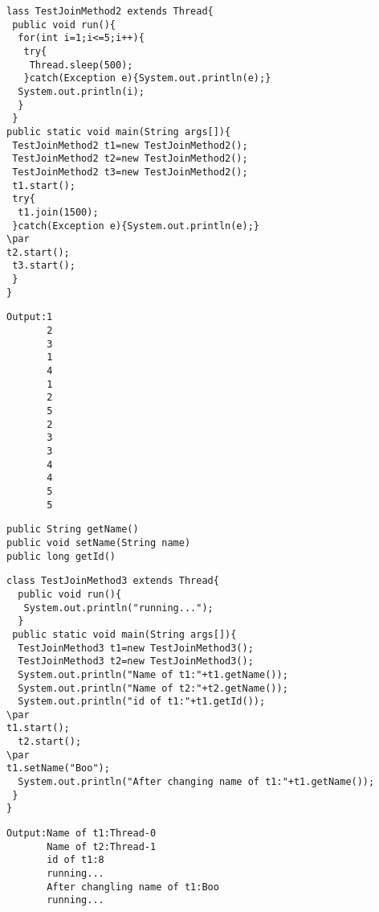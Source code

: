 \documentclass{book}
\def\lthtmlcheckvsize{\ifdim\ht\sizebox<\vsize 
  \ifdim\wd\sizebox<\hsize\expandafter\hfill\fi \expandafter\vfill
  \else\expandafter\vss\fi}%
\begin{document}
{\newpage\clearpage
{}%
\begin{lstlisting}
lass TestJoinMethod2 extends Thread{  
 public void run(){  
  for(int i=1;i<=5;i++){  
   try{  
    Thread.sleep(500);  
   }catch(Exception e){System.out.println(e);}  
  System.out.println(i);  
  }  
 }  
public static void main(String args[]){  
 TestJoinMethod2 t1=new TestJoinMethod2();  
 TestJoinMethod2 t2=new TestJoinMethod2();  
 TestJoinMethod2 t3=new TestJoinMethod2();  
 t1.start();  
 try{  
  t1.join(1500);  
 }catch(Exception e){System.out.println(e);}  
\par
t2.start();  
 t3.start();  
 }  
}  
\end{lstlisting}%
\lthtmlfigureZ
\lthtmlcheckvsize\clearpage}

{\newpage\clearpage
{}%
\begin{lstlisting}
Output:1
       2
       3
       1
       4
       1
       2
       5
       2
       3
       3
       4
       4
       5
       5
\end{lstlisting}%
\lthtmlfigureZ
\lthtmlcheckvsize\clearpage}

{\newpage\clearpage
{}%
\begin{lstlisting}
public String getName()
public void setName(String name)
public long getId()
\end{lstlisting}%
\lthtmlfigureZ
\lthtmlcheckvsize\clearpage}

{\newpage\clearpage
{}%
\begin{lstlisting}
class TestJoinMethod3 extends Thread{  
  public void run(){  
   System.out.println("running...");  
  }  
 public static void main(String args[]){  
  TestJoinMethod3 t1=new TestJoinMethod3();  
  TestJoinMethod3 t2=new TestJoinMethod3();  
  System.out.println("Name of t1:"+t1.getName());  
  System.out.println("Name of t2:"+t2.getName());  
  System.out.println("id of t1:"+t1.getId());  
\par
t1.start();  
  t2.start();  
\par
t1.setName("Boo");  
  System.out.println("After changing name of t1:"+t1.getName());  
 }  
}  
\end{lstlisting}%
\lthtmlfigureZ
\lthtmlcheckvsize\clearpage}

{\newpage\clearpage
{}%
\begin{lstlisting} 
Output:Name of t1:Thread-0
       Name of t2:Thread-1
       id of t1:8
       running...
       After changling name of t1:Boo
       running...
\end{lstlisting}%
\lthtmlfigureZ
\lthtmlcheckvsize\clearpage}
\end{document}
